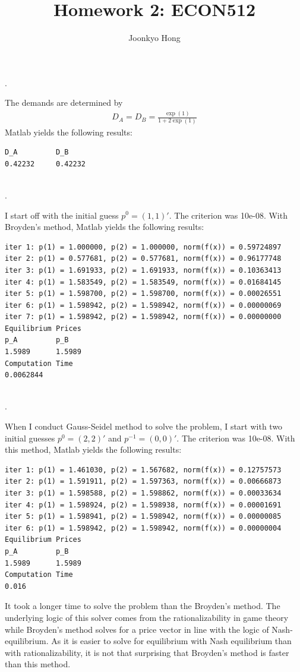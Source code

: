 \documentclass[10pt, letterpaper]{article}
\begin{document}
\title{Homework 2: ECON512}
\author{Joonkyo Hong}
\date{}
\maketitle
\smallskip

. 

\noindent The demands are determined by
\begin{align}
D_{A} = D_{B} = \frac{\exp(1)}{1+2\exp(1)} \nonumber
\end{align}
Matlab yields the following results:

\begin{verbatim}
D_A         D_B
0.42232     0.42232
\end{verbatim}

~\\

.

\noindent I start off with the initial guess $p^{0}=(1,1)'$. The criterion was 10e-08. With Broyden’s method, Matlab yields the following results:
\begin{verbatim}
iter 1: p(1) = 1.000000, p(2) = 1.000000, norm(f(x)) = 0.59724897
iter 2: p(1) = 0.577681, p(2) = 0.577681, norm(f(x)) = 0.96177748
iter 3: p(1) = 1.691933, p(2) = 1.691933, norm(f(x)) = 0.10363413
iter 4: p(1) = 1.583549, p(2) = 1.583549, norm(f(x)) = 0.01684145
iter 5: p(1) = 1.598700, p(2) = 1.598700, norm(f(x)) = 0.00026551
iter 6: p(1) = 1.598942, p(2) = 1.598942, norm(f(x)) = 0.00000069
iter 7: p(1) = 1.598942, p(2) = 1.598942, norm(f(x)) = 0.00000000
Equilibrium Prices
p_A         p_B
1.5989      1.5989
Computation Time
0.0062844
\end{verbatim}

~\\

. 

\noindent When I conduct Gauss-Seidel method to solve the problem, I start with two initial guesses $p^{0}=(2,2)'$ and $p^{-1}=(0,0)'$. The criterion was 10e-08. With this method, Matlab yields the following results:
\begin{verbatim}
iter 1: p(1) = 1.461030, p(2) = 1.567682, norm(f(x)) = 0.12757573
iter 2: p(1) = 1.591911, p(2) = 1.597363, norm(f(x)) = 0.00666873
iter 3: p(1) = 1.598588, p(2) = 1.598862, norm(f(x)) = 0.00033634
iter 4: p(1) = 1.598924, p(2) = 1.598938, norm(f(x)) = 0.00001691
iter 5: p(1) = 1.598941, p(2) = 1.598942, norm(f(x)) = 0.00000085
iter 6: p(1) = 1.598942, p(2) = 1.598942, norm(f(x)) = 0.00000004
Equilibrium Prices
p_A         p_B
1.5989      1.5989
Computation Time
0.016
\end{verbatim}
It took a longer time to solve the problem than the Broyden's method. The underlying logic of this solver comes from the rationalizability in game theory while Broyden's method solves for a price vector in line with the logic of Nash-equilibrium. As it is easier to solve for equilibrium with Nash equilibrium than with rationalizability, it is not that surprising that Broyden's method is 
faster than this method.
\end{document}
